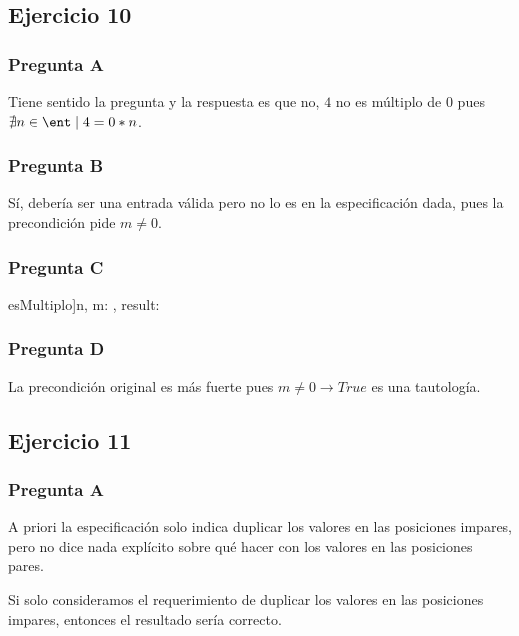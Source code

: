 \subsection{Ejercicio 10}

\subsubsection{Pregunta A}

Tiene sentido la pregunta y la respuesta es que no, $4$ no es múltiplo de $0$ pues $\nexists n \in \ent \mid 4 = 0 * n$.

\subsubsection{Pregunta B}

Sí, debería ser una entrada válida pero no lo es en la especificación dada, pues la precondición pide $m \neq 0$.

\subsubsection{Pregunta C}

\begin{proc}{esMultiplo]}{\In n, m: \ent, \Out result: \bool}{}
\end{proc}

\subsubsection{Pregunta D}

La precondición original es más fuerte pues $m \neq 0 \rightarrow True$ es una tautología.

\subsection{Ejercicio 11}

\subsubsection{Pregunta A}

A priori la especificación solo indica duplicar los valores en las posiciones impares, pero no dice nada explícito sobre qué hacer con los valores en las posiciones pares.

Si solo consideramos el requerimiento de duplicar los valores en las posiciones impares, entonces el resultado sería correcto.

